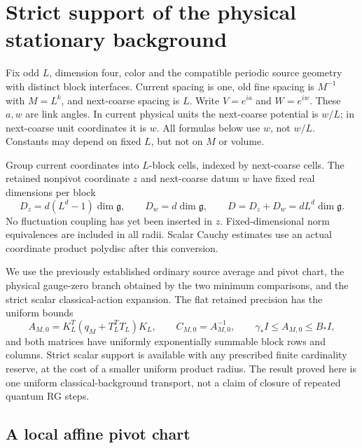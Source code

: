 \documentclass[11pt]{article}
\theoremstyle{remark}\newtheorem{remark}[theorem]{Remark}
\begin{document}
\section{Strict support of the physical stationary background}
\label{st-section}

Fix odd $L$, dimension four, color and the compatible periodic source
geometry with distinct block interfaces. Current spacing is one, old
fine spacing is $M^{-1}$ with $M=L^k$, and next-coarse spacing is $L$.
Write $V=e^{ia}$ and $W=e^{iw}$. These $a,w$ are link angles. In current
physical units the next-coarse potential is $w/L$; in next-coarse unit
coordinates it is $w$. All formulas below use $w$, not $w/L$.
Constants may depend on fixed $L$, but not on $M$ or volume.

Group current coordinates into $L$-block cells, indexed by next-coarse
cells. The retained nonpivot coordinate $z$ and next-coarse datum $w$
have fixed real dimensions per block
\begin{equation}
 D_z=d(L^d-1)\dim\mathfrak g,\qquad D_w=d\dim\mathfrak g,
 \qquad D=D_z+D_w=dL^d\dim\mathfrak g.                         \label{st-dimensions}
\end{equation}
No fluctuation coupling has yet been inserted in $z$. Fixed-dimensional
norm equivalences are included in all radii. Scalar Cauchy estimates use
an actual coordinate product polydisc after this conversion.

We use the previously established ordinary source average and pivot
chart, the physical gauge-zero branch obtained by the two minimum
comparisons, and the strict scalar classical-action expansion. The flat
retained precision has the uniform bounds
\begin{equation}
 A_{M,0}=K_L^T(q_M+T_L^TT_L)K_L,\qquad C_{M,0}=A_{M,0}^{-1},
 \qquad \gamma_*I\le A_{M,0}\le B_*I,                         \label{st-flat-precision}
\end{equation}
and both matrices have uniformly exponentially summable block rows and
columns. Strict scalar support is available with any prescribed finite
cardinality reserve, at the cost of a smaller uniform product radius.
The result proved here is one uniform classical-background transport,
not a claim of closure of repeated quantum RG steps.

\subsection{A local affine pivot chart}
\label{st-affine-section}
\end{document}
